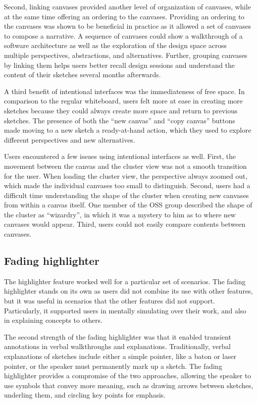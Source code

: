 Second, linking canvases provided another level of organization of canvases, while at the same time offering an ordering to the canvases. Providing an ordering to the canvases was shown to be beneficial in practice as it allowed a set of canvases to compose a narrative. A sequence of canvases could show a walkthrough of a software architecture as well as the exploration of the design space across multiple perspectives, abstractions, and alternatives. Further, grouping canvases by linking them helps users better recall design sessions and understand the content of their sketches several months afterwards.

A third benefit of intentional interfaces was the immediateness of free space. In comparison to the regular whiteboard, users felt more at ease in creating more sketches because they could always create more space and return to previous sketches. The presence of both the ``new canvas'' and ``copy canvas'' buttons made moving to a new sketch a ready-at-hand action, which they used to explore different perspectives and new alternatives.

Users encountered a few issues using intentional interfaces as well. First, the movement between the canvas and the cluster view was not a smooth transition for the user. When loading the cluster view, the perspective always zoomed out, which made the individual canvases too small to distinguish. Second, users had a difficult time understanding the shape of the cluster when creating new canvases from within a canvas itself. One member of the OSS group described the shape of the cluster as ``wizardry'', in which it was a mystery to him as to where new canvases would appear. Third, users could not easily compare contents between canvases.

\subsection{Fading highlighter}

	
The highlighter feature worked well for a particular set of scenarios. The fading highlighter stands on its own as users did not combine its use with other features, but it was useful in scenarios that the other features did not support. Particularly, it supported users in mentally simulating over their work, and also in explaining concepts to others. 

The second strength of the fading highlighter was that it enabled transient annotations in verbal walkthroughs and explanations. Traditionally, verbal explanations of sketches include either a simple pointer, like a baton or laser pointer, or the speaker must permanently mark up a sketch. The fading highlighter provides a compromise of the two approaches, allowing the speaker to use symbols that convey more meaning, such as drawing arrows between sketches, underling them, and circling key points for emphasis.

